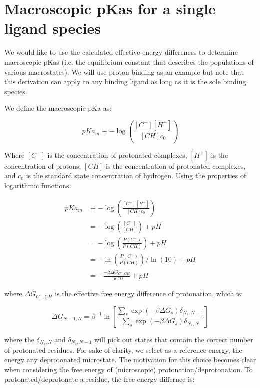 \section{Macroscopic pKas for a single ligand species}

We would like to use the calculated effective energy differences to
determine macroscopic pKas (i.e. the equilibrium constant that
describes the populations of various macrostates). We will use proton
binding as an example but note that this derivation can apply to any
binding ligand as long as it is the sole binding species.

We define the macroscopic pKa as:

\begin{equation}
  pKa_m \equiv -\log \left(\frac{[C^-][H^+]}{[CH] c_0} \right)
\end{equation}

Where $[C^-]$ is the concentration of protonated complexes, $[H^+]$ is
the concentration of protons, $[CH]$ is the concentration of
protonated complexes, and $c_0$ is the standard state concentration of
hydrogen. Using the properties of logarithmic functions:

\begin{align*}
  pKa_m &\equiv -\log \left(\frac{[C^-][H^+]}{[CH] c_0} \right) \\
  &= -\log \left( \frac{[C^-]}{[CH]} \right) + pH \\
  &= -\log \left(\frac{P(C^-)}{P(CH)} \right) + pH \\
  &= -\ln \left( \frac{P(C^-)}{P(CH)} \right)/\ln(10) + pH \\
  &= -\frac{-\beta \Delta G_{C^-,CH}}{\ln 10} + pH
\end{align*}

where $\Delta G_{C^-,CH}$ is the effective free energy difference of
protonation, which is: 

\begin{equation}
\Delta G_{N-1,N} = \beta^{-1} \ln \left[ \frac{\sum_s \exp(-\beta
    \Delta G_s)\delta_{N_s,N-1}}{\sum_s \exp(-\beta \Delta
    G_s)\delta_{N_s,N}} \right]
\end{equation}

where the $\delta_{N_s,N}$ and $\delta_{N_s,N-1}$ will pick out states
that contain the correct number of protonated residues. For sake of
clarity, we select as a reference energy, the energy any deprotonated
microstate. The motivation for this choice becomes clear when
considering the free energy of (microscopic)
protonation/deprotonation. To protonated/deprotonate a residue, the free energy differnce is:

